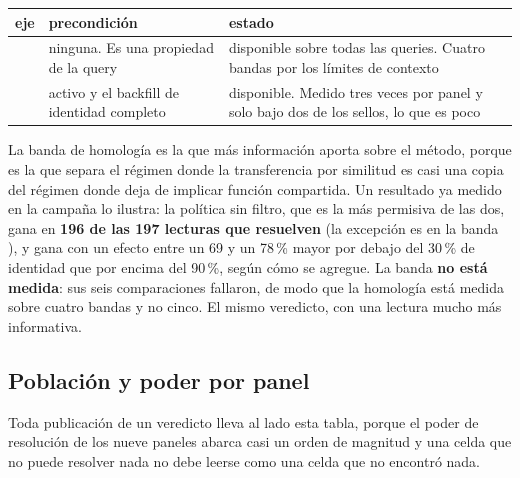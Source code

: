 \begin{center}
\begin{tabularx}{\linewidth}{@{}L{2.3cm} L{3.4cm} X@{}}
\toprule
eje & precondición & estado\\
\midrule
{}    & ninguna. Es una propiedad de la query & disponible sobre todas las queries. Cuatro bandas por los límites de contexto\\
  &  activo y el backfill de identidad completo & disponible. Medido tres veces por panel y solo bajo dos de los sellos, lo que es poco\\
\bottomrule
\end{tabularx}
\end{center}

La banda de homología es la que más información aporta sobre el método, porque es
la que separa el régimen donde la transferencia por similitud es casi una copia del
régimen donde deja de implicar función compartida. Un resultado ya medido en la
campaña lo ilustra: la política sin filtro, que es la más permisiva de las dos,
gana en \textbf{196 de las 197 lecturas que resuelven} (la excepción es
 en la banda ), y gana con un efecto entre un 69 y un 78\,\%
mayor por debajo del 30\,\% de identidad que por encima del 90\,\%, según cómo se
agregue. La banda  \textbf{no está medida}: sus seis comparaciones
fallaron, de modo que la homología está medida sobre cuatro bandas y no cinco. El mismo veredicto, con una lectura mucho más informativa.

\subsection{Población y poder por panel}

Toda publicación de un veredicto lleva al lado esta tabla, porque el poder de
resolución de los nueve paneles abarca casi un orden de magnitud y una celda que
no puede resolver nada no debe leerse como una celda que no encontró nada.

